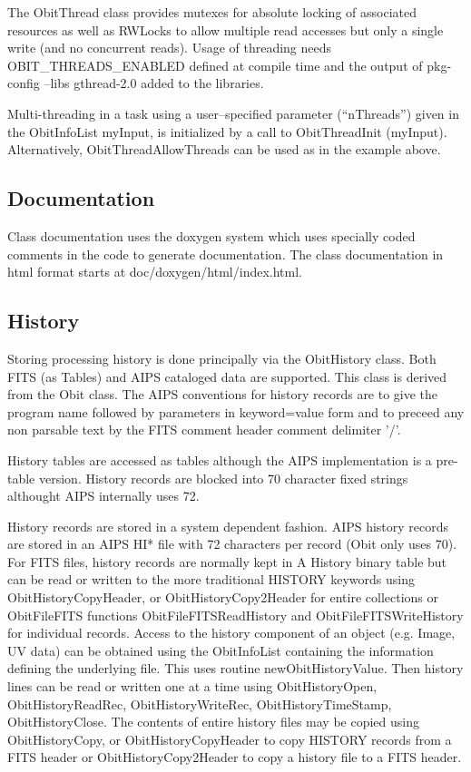 \documentclass[11pt]{article}
\begin{document}
The ObitThread class  provides mutexes for absolute 
locking of associated resources as well as RWLocks to allow multiple
read accesses but only a single write (and no concurrent reads).
Usage of threading needs OBIT\_THREADS\_ENABLED defined at compile time and
the output of  pkg-config --libs gthread-2.0 added to the libraries.

Multi-threading in a task using a user--specified parameter
(``nThreads'') given in the ObitInfoList myInput, is initialized by a
call to ObitThreadInit (myInput).
Alternatively, ObitThreadAllowThreads can be used as in the example above.

\subsection{Documentation}
Class documentation uses the doxygen system which uses specially coded
comments in the code to generate documentation.
The class documentation in html format starts at doc/doxygen/html/index.html.

\subsection{History}
Storing processing history is done principally via the ObitHistory class.
Both FITS (as Tables) and AIPS cataloged data are supported.
This class is derived from the Obit class.
The AIPS conventions for history records are to give the program name followed
by parameters in keyword=value form and to preceed any non parsable text
by the FITS comment header comment delimiter '/'.

History tables are accessed as tables although the AIPS implementation 
is a pre-table version.  
History records are blocked into 70 character  fixed strings althought
AIPS internally uses 72. 

History records are stored in a system dependent fashion.
AIPS history records are stored in an AIPS HI* file with 72 characters 
per record (Obit only uses 70).
For FITS files, history records are normally kept in A History binary table
but can be read or written to the more traditional HISTORY keywords using
ObitHistoryCopyHeader, or ObitHistoryCopy2Header for entire collections
or ObitFileFITS functions ObitFileFITSReadHistory and ObitFileFITSWriteHistory
for individual records.
Access to the history component of an object (e.g. Image, UV data) can
be obtained using the ObitInfoList containing the information defining the 
underlying file.
This uses routine newObitHistoryValue.
Then history lines can be read or written one at a time using ObitHistoryOpen, 
ObitHistoryReadRec, ObitHistoryWriteRec, ObitHistoryTimeStamp, ObitHistoryClose.
The contents of entire history files may be copied  using ObitHistoryCopy, or
ObitHistoryCopyHeader to copy HISTORY records from a FITS header or
ObitHistoryCopy2Header to copy a history file to a FITS header.
\end{document}
